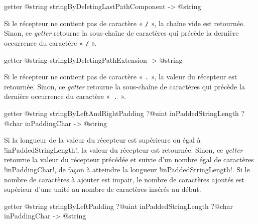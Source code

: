 
\begin{galgas3box}
getter @string stringByDeletingLastPathComponent -> @string
\end{galgas3box}

Si le récepteur ne contient pas de caractère « \texttt{/} », la chaîne vide est retournée. Sinon, ce \emph{getter} retourne la sous-chaîne de caractères qui précède la dernière occurrence du caractère « \texttt{/} ».










\begin{galgas3box}
getter @string stringByDeletingPathExtension -> @string
\end{galgas3box}

Si le récepteur ne contient pas de caractère « \texttt{.} », la valeur du récepteur est retournée. Sinon, ce \emph{getter} retourne la sous-chaîne de caractères qui précède la dernière occurrence du caractère «~\texttt{.}~».









\begin{galgas3box}
getter @string stringByLeftAndRightPadding
   ?@uint inPaddedStringLength
   ?@char inPaddingChar -> @string
\end{galgas3box}

Si la longueur de la valeur du récepteur est supérieure ou égal à \ggst!inPaddedStringLength!, la valeur du récepteur est retournée. Sinon, ce \emph{getter} retourne la valeur du récepteur précédée et suivie d'un nombre égal de caractères \ggst!inPaddingChar!, de façon à atteindre la longueur \ggst!inPaddedStringLength!. Si le nombre de caractères à ajouter est impair, le nombre de caractères ajoutés est supérieur d'une unité au nombre de caractères insérés au début.









\begin{galgas3box}
getter @string stringByLeftPadding
   ?@uint inPaddedStringLength
   ?@char inPaddingChar -> @string
\end{galgas3box}

